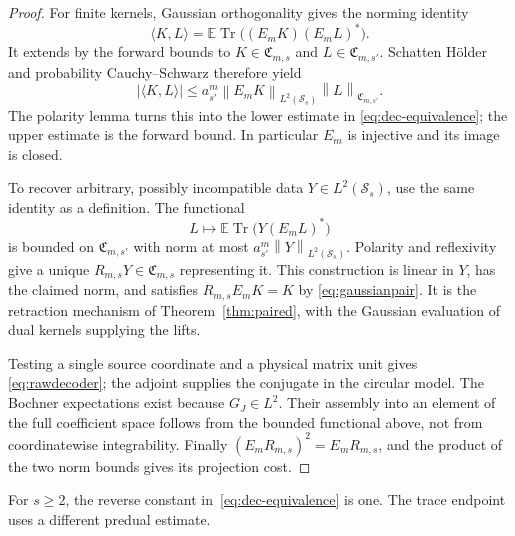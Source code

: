 \documentclass[11pt,a4paper]{amsart}
\numberwithin{equation}{section}
\theoremstyle{definition}
\theoremstyle{remark}
\newcommand{\E}{\mathbb E}
\newcommand{\Sch}{\mathcal S}
\newcommand{\Coeff}{\mathfrak C}
\DeclareMathOperator{\Tr}{Tr}
\newcommand{\norm}[1]{\left\lVert#1\right\rVert}
\begin{document}
\begin{proof}
For finite kernels, Gaussian orthogonality gives the norming identity
\begin{equation}\label{eq:gaussianpair}
 \langle K,L\rangle=\E\Tr\big((E_mK)(E_mL)^*\big).
\end{equation}
It extends by the forward bounds to $K\in\Coeff_{m,s}$ and $L\in\Coeff_{m,s'}$. Schatten H\"older and probability Cauchy--Schwarz therefore yield
\[
 |\langle K,L\rangle|
 \le a_{s'}^m\norm{E_mK}_{L^2(\Sch_s)}\norm L_{\Coeff_{m,s'}}.
\]
The polarity lemma turns this into the lower estimate in \eqref{eq:dec-equivalence}; the upper estimate is the forward bound. In particular $E_m$ is injective and its image is closed.

To recover arbitrary, possibly incompatible data $Y\in L^2(\Sch_s)$, use the same identity as a definition. The functional
\[
 L\longmapsto\E\Tr\big(Y(E_mL)^*\big)
\]
is bounded on $\Coeff_{m,s'}$ with norm at most $a_{s'}^m\norm Y_{L^2(\Sch_s)}$. Polarity and reflexivity give a unique $R_{m,s}Y\in\Coeff_{m,s}$ representing it. This construction is linear in $Y$, has the claimed norm, and satisfies $R_{m,s}E_mK=K$ by \eqref{eq:gaussianpair}. It is the retraction mechanism of Theorem~\ref{thm:paired}, with the Gaussian evaluation of dual kernels supplying the lifts.

Testing a single source coordinate and a physical matrix unit gives \eqref{eq:rawdecoder}; the adjoint supplies the conjugate in the circular model. The Bochner expectations exist because $G_J\in L^2$. Their assembly into an element of the full coefficient space follows from the bounded functional above, not from coordinatewise integrability. Finally $(E_mR_{m,s})^2=E_mR_{m,s}$, and the product of the two norm bounds gives its projection cost.
\end{proof}

For $s\ge2$, the reverse constant in~\eqref{eq:dec-equivalence} is one. The trace endpoint uses a different predual estimate.
\end{document}
